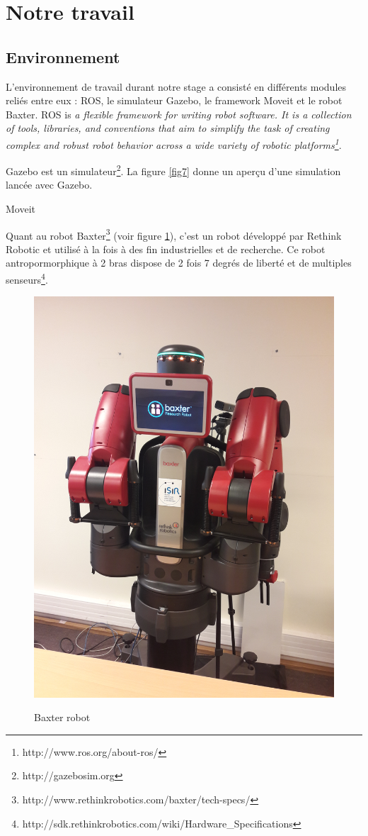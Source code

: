 \documentclass{llncs}
\begin{document}

\section{Notre travail}


\subsection{Environnement}

L'environnement de travail durant notre stage a consisté en différents modules reliés entre eux : ROS,  le simulateur  Gazebo, le framework Moveit et le robot Baxter. ROS is \textit{a flexible framework for writing robot software. It is a collection of tools, libraries, and conventions that aim to simplify the task of creating complex and robust robot behavior across a wide variety of robotic platforms\footnote{http://www.ros.org/about-ros/}}.

Gazebo est un simulateur\footnote{http://gazebosim.org}. La figure \ref{fig7} donne un aperçu d'une simulation lancée avec Gazebo.

Moveit

Quant au robot Baxter\footnote{http://www.rethinkrobotics.com/baxter/tech-specs/} (voir figure \ref{fig:baxter}), c'est un robot développé par Rethink Robotic et utilisé à la fois à des fin industrielles et de recherche. Ce robot antropormorphique à 2 bras dispose de 2 fois 7 degrés de liberté et de multiples  senseurs\footnote{http://sdk.rethinkrobotics.com/wiki/Hardware\_Specifications}.

\begin{figure}
	\centering
	\includegraphics[angle=-90,width=.5\textwidth]{figures/baxter}
	\label{fig:baxter}
	\caption{Baxter robot}
\end{figure}
\end{document}
